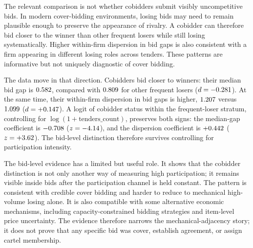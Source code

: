 The relevant comparison is not whether cobidders submit visibly
uncompetitive bids. In modern cover-bidding environments,
losing bids may need to remain plausible enough to preserve the
appearance of rivalry. A cobidder can therefore bid closer to
the winner than other frequent losers while still losing
systematically. Higher within-firm dispersion in bid gaps is
also consistent with a firm appearing in different losing roles
across tenders. These patterns are informative but not uniquely
diagnostic of cover bidding.

The data move in that direction. Cobidders bid closer to
winners: their median bid gap is $0.582$, compared
with $0.809$ for other frequent losers
($d=-0.281$). At the same time, their within-firm
dispersion in bid gaps is higher, $1.207$ versus
$1.099$ ($d=+0.147$). A logit of cobidder
status within the frequent-loser stratum, controlling for
$\log(1+\text{tenders\_count})$, preserves both signs: the
median-gap coefficient is $-0.708$
($z=-4.14$), and the dispersion coefficient is
$+0.442$ ($z=+3.62$). The bid-level
distinction therefore survives controlling for participation
intensity.

The bid-level evidence has a limited but useful role. It shows
that the cobidder distinction is not only another way of
measuring high participation; it remains visible inside bids
after the participation channel is held constant. The pattern
is consistent with credible cover bidding and harder to reduce
to mechanical high-volume losing alone. It is also compatible
with some alternative economic mechanisms, including
capacity-constrained bidding strategies and item-level price
uncertainty. The evidence therefore narrows the
mechanical-adjacency story; it does not prove that any specific
bid was cover, establish agreement, or assign cartel
membership.

